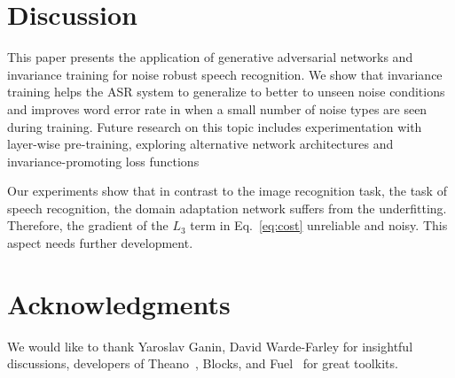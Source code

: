 \documentclass{article}
\begin{document}
\section{Discussion}
    This paper presents the application of generative adversarial networks and invariance training for noise robust speech recognition. We show that invariance training helps the ASR system to generalize to better to unseen noise
    conditions and improves word error rate in when a small number of noise types are seen during training. Future
    research on this topic includes experimentation with layer-wise pre-training,
    exploring alternative network architectures and invariance-promoting loss functions
        
    Our experiments show that in contrast to the image recognition task,
    the task of speech recognition,  the domain adaptation network suffers from
    the underfitting. Therefore, the gradient of the $L_3$ term in Eq.~\ref{eq:cost}
    unreliable and noisy. This aspect needs further development.


\section*{Acknowledgments}

We would like to thank Yaroslav Ganin, David Warde-Farley for insightful discussions,
developers of Theano~\cite{2016arXiv160502688short}, Blocks, and Fuel~\cite{MerrienboerBDSW15} 
for great toolkits.

%


\end{document}
